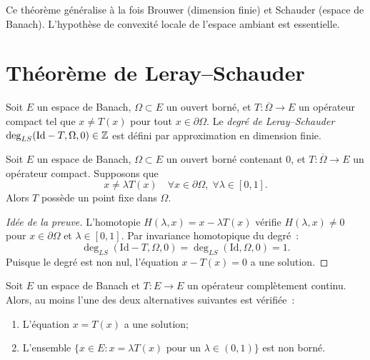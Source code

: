 \begin{remarque}
Ce th\'eor\`eme g\'en\'eralise \`a la fois Brouwer (dimension finie) et Schauder
(espace de Banach). L'hypoth\`ese de convexit\'e locale de l'espace ambiant est
essentielle.
\end{remarque}

\section{Th\'eor\`eme de Leray--Schauder}

\begin{definition}
Soit $E$ un espace de Banach, $\Omega \subset E$ un ouvert born\'e, et
$T : \overline{\Omega} \to E$ un op\'erateur compact tel que
$x \neq T(x)$ pour tout $x \in \partial\Omega$. Le \emph{degr\'e de
Leray--Schauder} $\deg_{LS}(\mathrm{Id} - T, \Omega, 0) \in \mathbb{Z}$ est d\'efini
par approximation en dimension finie.
\end{definition}

\begin{theoreme}\label{thm:leray-schauder}
Soit $E$ un espace de Banach, $\Omega \subset E$ un ouvert born\'e contenant
$0$, et $T : \overline{\Omega} \to E$ un op\'erateur compact. Supposons que
\[
    x \neq \lambda T(x) \quad \forall x \in \partial\Omega, \; \forall \lambda \in [0, 1].
\]
Alors $T$ poss\`ede un point fixe dans $\Omega$.
\end{theoreme}

\begin{proof}[Id\'ee de la preuve]
L'homotopie $H(\lambda, x) = x - \lambda T(x)$ v\'erifie $H(\lambda, x) \neq 0$
pour $x \in \partial\Omega$ et $\lambda \in [0,1]$. Par invariance homotopique
du degr\'e~:
\[
    \deg_{LS}(\mathrm{Id} - T, \Omega, 0) = \deg_{LS}(\mathrm{Id}, \Omega, 0) = 1.
\]
Puisque le degr\'e est non nul, l'\'equation $x - T(x) = 0$ a une solution.
\end{proof}

\begin{corollaire}
Soit $E$ un espace de Banach et $T : E \to E$ un op\'erateur compl\`etement
continu. Alors, au moins l'une des deux alternatives suivantes est v\'erifi\'ee~:
\begin{enumerate}
    \item L'\'equation $x = T(x)$ a une solution;
    \item L'ensemble $\{x \in E : x = \lambda T(x) \text{ pour un } \lambda \in (0,1)\}$
          est non born\'e.
\end{enumerate}
\end{corollaire}

